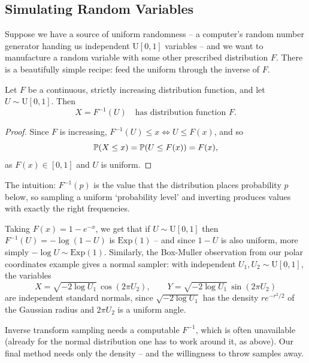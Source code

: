 \documentclass[a4paper]{scrartcl}
\begin{document}
\subsection{Simulating Random Variables}

Suppose we have a source of uniform randomness -- a computer's random number generator handing us independent $\mathrm{U}[0, 1]$ variables -- and we want to manufacture a random variable with some other prescribed distribution $F$. There is a beautifully simple recipe: feed the uniform through the inverse of $F$.

\begin{theorem}
	Let $F$ be a continuous, strictly increasing distribution function, and let $U \sim \mathrm{U}[0, 1]$. Then
	$$
	X = F^{-1}(U) \quad \text{has distribution function } F.
	$$
\end{theorem}
\begin{proof}
	Since $F$ is increasing, $F^{-1}(U) \leq x \iff U \leq F(x)$, and so
	$$
	\mathbb{P}(X \leq x) = \mathbb{P}(U \leq F(x)) = F(x),
	$$
	as $F(x) \in [0, 1]$ and $U$ is uniform.
\end{proof}

The intuition: $F^{-1}(p)$ is the value that the distribution places probability $p$ below, so sampling a uniform `probability level' and inverting produces values with exactly the right frequencies.

\begin{example}
	Taking $F(x) = 1 - e^{-x}$, we get that if $U \sim \mathrm{U}[0,1]$ then $F^{-1}(U) = -\log(1 - U)$ is $\mathrm{Exp}(1)$ -- and since $1 - U$ is also uniform, more simply $-\log U \sim \mathrm{Exp}(1)$. Similarly, the Box-Muller observation from our polar coordinates example gives a normal sampler: with independent $U_1, U_2 \sim \mathrm{U}[0,1]$, the variables
	$$
	X = \sqrt{-2\log U_1}\,\cos(2\pi U_2), \qquad Y = \sqrt{-2\log U_1}\,\sin(2\pi U_2)
	$$
	are independent standard normals, since $\sqrt{-2\log U_1}$ has the density $re^{-r^2/2}$ of the Gaussian radius and $2\pi U_2$ is a uniform angle.
\end{example}

Inverse transform sampling needs a computable $F^{-1}$, which is often unavailable (already for the normal distribution one has to work around it, as above). Our final method needs only the density -- and the willingness to throw samples away.
\end{document}
